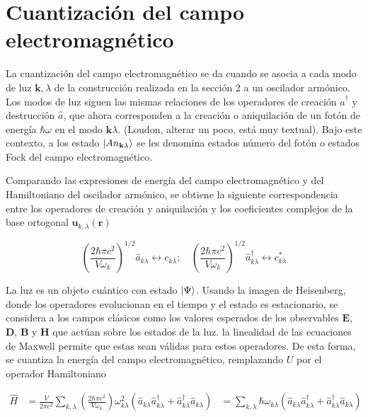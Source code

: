 \section{Cuantización del campo electromagnético}

La cuantización del campo electromagnético se da cuando se asocia a cada modo de luz $\mathbf{k},\lambda$ de la construcción realizada en la sección 2 a un oscilador armónico. Los modos de luz siguen las mismas relaciones de los operadores de creación $\hat{a}^{\dagger}$ y destrucción $\hat{a}$, que ahora corresponden a la creación o aniquilación de un fotón de energía $\hbar\omega$ en el modo $\mathbf{k}\lambda$. (Loudon, alterar un poco, está muy textual). Bajo este contexto, a los estado $\ket{A{n}_{\mathbf{k}\lambda}}$ se les denomina estados número del fotón o estados Fock del campo electromagnético.

Comparando las expresiones de energía del campo electromagnético y del Hamiltoniano del oscilador armónico, se obtiene la siguiente correspondencia entre los operadores de creación y aniquilación y los coeficientes complejos de la base ortogonal $\mathbf{u}_{k,\lambda}(\mathbf{r})$ \cite{Loudon}

\begin{equation*}
  \left( \frac{2\hbar \pi c^2}{V\omega_k} \right)^{1/2} \hat{a}_{k\lambda} \leftrightarrow c_{k\lambda}; \quad \left( \frac{2\hbar \pi c^2}{V\omega_k} \right)^{1/2} \hat{a}^{\dagger}_{k\lambda} \leftrightarrow c_{k\lambda}^*
\end{equation*}

La luz es un objeto cuántico con estado $\ket{\Psi}$. Usando la imagen de Heisenberg, donde los operadores evolucionan en el tiempo y el estado es estacionario, se considera a los campos clásicos como los valores esperados de los observables $\mathbf{E}$, $\mathbf{D}$, $\mathbf{B}$ y $\mathbf{H}$ que actúan sobre los estados de la luz. la linealidad de las ecuaciones de Maxwell  permite que estas sean válidas para estos operadores. \cite{Leonhardt} De esta forma, se cuantiza la energía del campo electromagnético, remplazando $U$ por el operador Hamiltoniano

\begin{align*}
  \hat{H} & =  \frac{V}{2\pi c^2}\sum_{k,\lambda} \left( \frac{2\hbar \pi c^2}{V\omega_k} \right) \omega_{k\lambda}^2 \left( \hat{a}_{k\lambda} \hat{a}^{\dagger}_{k\lambda} + \hat{a}^{\dagger}_{k\lambda} \hat{a}_{k\lambda} \right)
          & = \sum_{k,\lambda} \hbar \omega_{k\lambda} \left( \hat{a}_{k\lambda} \hat{a}^{\dagger}_{k\lambda} + \hat{a}^{\dagger}_{k\lambda} \hat{a}_{k\lambda} \right)
\end{align*}

